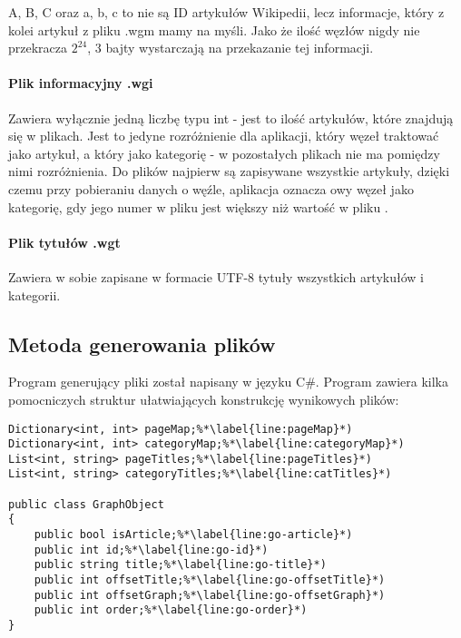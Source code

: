 
A, B, C oraz a, b, c to nie są ID artykułów Wikipedii, lecz informacje, który z kolei artykuł z pliku .wgm mamy na myśli. Jako że ilość węzłów nigdy nie przekracza $2^{24}$, 3 bajty wystarczają na przekazanie tej informacji.

\paragraph{Plik informacyjny .wgi}

Zawiera wyłącznie jedną liczbę typu int - jest to ilość artykułów, które znajdują się w plikach. Jest to jedyne rozróżnienie dla aplikacji, który węzeł traktować jako artykuł, a który jako kategorię - w pozostałych plikach nie ma pomiędzy nimi rozróżnienia. Do plików najpierw są zapisywane wszystkie artykuły, dzięki czemu przy pobieraniu danych o węźle, aplikacja oznacza owy węzeł jako kategorię, gdy jego numer w pliku  jest większy niż wartość w pliku . 

\paragraph{Plik tytułów .wgt}

Zawiera w sobie zapisane w formacie UTF-8 tytuły wszystkich artykułów i kategorii.

\subsection{Metoda generowania plików}

Program generujący pliki  został napisany w języku C\#.
Program zawiera kilka pomocniczych struktur ułatwiających konstrukcję wynikowych plików:

\begin{minipage}{\linewidth}
\begin{lstlisting}[caption={Pomocnicze struktury dla programu generującego pliki dla aplikacji}, label=lst:graph-object]
Dictionary<int, int> pageMap;%*\label{line:pageMap}*)
Dictionary<int, int> categoryMap;%*\label{line:categoryMap}*)
List<int, string> pageTitles;%*\label{line:pageTitles}*)
List<int, string> categoryTitles;%*\label{line:catTitles}*)

public class GraphObject
{
    public bool isArticle;%*\label{line:go-article}*)
    public int id;%*\label{line:go-id}*)
    public string title;%*\label{line:go-title}*)
    public int offsetTitle;%*\label{line:go-offsetTitle}*)
    public int offsetGraph;%*\label{line:go-offsetGraph}*)
    public int order;%*\label{line:go-order}*)
}
\end{lstlisting}
\end{minipage}

